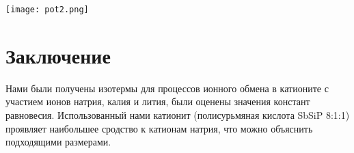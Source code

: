 \documentclass[a4paper]{article}
\begin{document}
\graphicspath{{./images/}}
		\begin{center}
		
			\texttt{[image: pot2.png]}
	

	\par
 \vspace{0.3cm}
 \end{center}
\vspace{0.3cm}
\par

\section{Заключение}
Нами были получены изотермы для процессов ионного обмена в катионите с участием ионов натрия, калия и лития, были оценены значения констант равновесия. Использованный нами катионит (полисурьмяная кислота SbSiP 8:1:1) проявляет наибольшее сродство к катионам натрия, что можно объяснить подходящими размерами.

 
\end{document}
